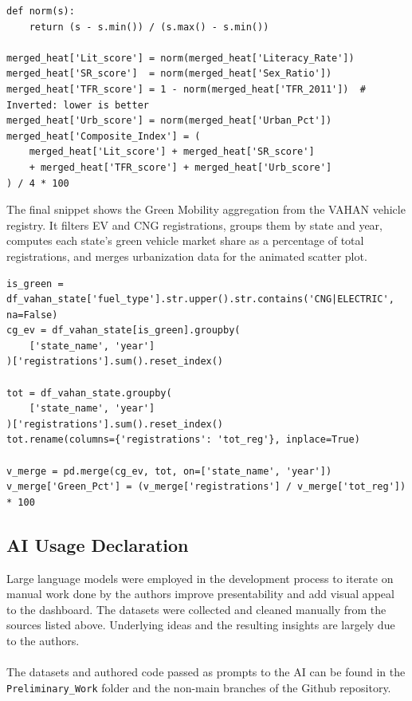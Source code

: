 \documentclass[abstract=true]{scrartcl}
\begin{document}
\begin{verbatim}
def norm(s): 
    return (s - s.min()) / (s.max() - s.min())

merged_heat['Lit_score'] = norm(merged_heat['Literacy_Rate'])
merged_heat['SR_score']  = norm(merged_heat['Sex_Ratio'])
merged_heat['TFR_score'] = 1 - norm(merged_heat['TFR_2011'])  # Inverted: lower is better
merged_heat['Urb_score'] = norm(merged_heat['Urban_Pct'])
merged_heat['Composite_Index'] = (
    merged_heat['Lit_score'] + merged_heat['SR_score'] 
    + merged_heat['TFR_score'] + merged_heat['Urb_score']
) / 4 * 100
\end{verbatim}

The final snippet shows the Green Mobility aggregation from the VAHAN vehicle registry. It filters EV and CNG registrations, groups them by state and year, computes each state's green vehicle market share as a percentage of total registrations, and merges urbanization data for the animated scatter plot.

\begin{verbatim}
is_green = df_vahan_state['fuel_type'].str.upper().str.contains('CNG|ELECTRIC', na=False)
cg_ev = df_vahan_state[is_green].groupby(
    ['state_name', 'year']
)['registrations'].sum().reset_index()

tot = df_vahan_state.groupby(
    ['state_name', 'year']
)['registrations'].sum().reset_index()
tot.rename(columns={'registrations': 'tot_reg'}, inplace=True)

v_merge = pd.merge(cg_ev, tot, on=['state_name', 'year'])
v_merge['Green_Pct'] = (v_merge['registrations'] / v_merge['tot_reg']) * 100
\end{verbatim}

\subsection{AI Usage Declaration}
Large language models were employed in the development process to iterate on manual work done by the authors improve presentability and add visual appeal to the dashboard. The datasets were collected and cleaned manually from the sources listed above. Underlying ideas and the resulting insights are largely due to the authors.
\\\\
The datasets and authored code passed as prompts to the AI can be found in the \verb|Preliminary_Work| folder and the non-main branches of the Github repository.
\end{document}
